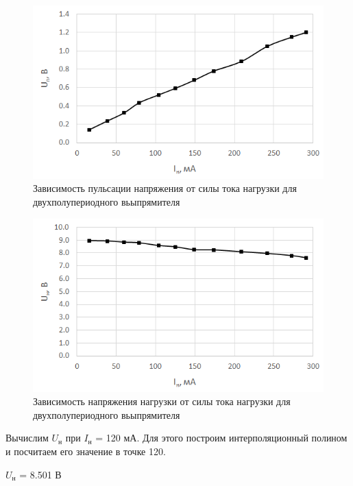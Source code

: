 \begin{figure}[H]
	\begin{center}
		\includegraphics[width=15cm]{img/4}
		\caption{Зависимость пульсации напряжения от силы тока нагрузки для двухполупериодного вьыпрямителя}
		\label{g:4} %
	\end{center}
\end{figure}

\begin{figure}[H]
	\begin{center}
		\includegraphics[width=15cm]{img/5}
		\caption{Зависимость напряжения нагрузки от силы тока нагрузки для двухполупериодного вьыпрямителя}
		\label{g:5} %
	\end{center}
\end{figure}

Вычислим $U_\text{н}$ при $I_\text{н}$ = 120 мА. Для этого построим интерполяционный полином и посчитаем его значение в точке 120.

$U_\text{н}$ = 8.501 В

